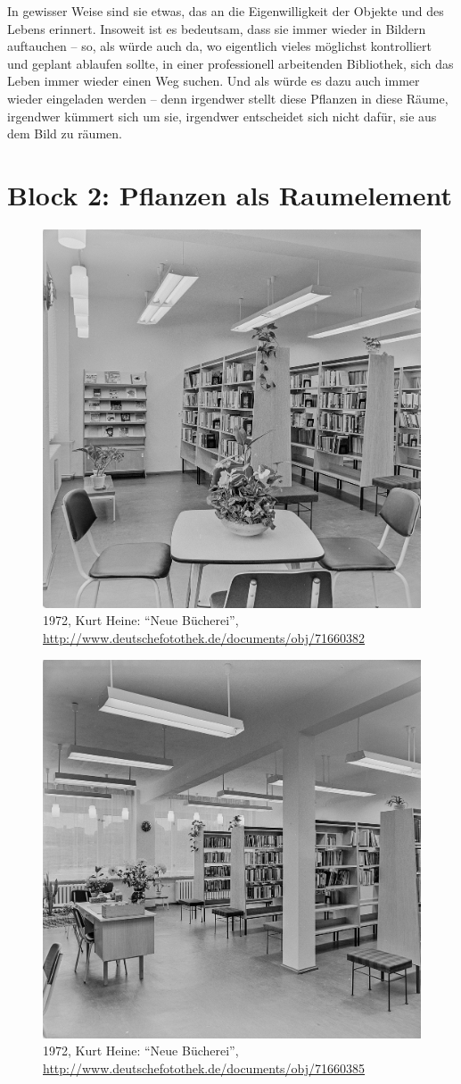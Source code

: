 \documentclass[a4paper,
fontsize=11pt,
oneside,
numbers=noperiodatend,
parskip=half-,
bibliography=totoc,
final
]{scrartcl}
\begin{document}
In gewisser Weise sind sie etwas, das an die Eigenwilligkeit der Objekte
und des Lebens erinnert. Insoweit ist es bedeutsam, dass sie immer
wieder in Bildern auftauchen -- so, als würde auch da, wo eigentlich
vieles möglichst kontrolliert und geplant ablaufen sollte, in einer
professionell arbeitenden Bibliothek, sich das Leben immer wieder einen
Weg suchen. Und als würde es dazu auch immer wieder eingeladen werden --
denn irgendwer stellt diese Pflanzen in diese Räume, irgendwer kümmert
sich um sie, irgendwer entscheidet sich nicht dafür, sie aus dem Bild zu
räumen.

\hypertarget{block-2-pflanzen-als-raumelement}{%
\section{Block 2: Pflanzen als
Raumelement}\label{block-2-pflanzen-als-raumelement}}

\begin{figure}
\centering
\includegraphics[width=0.7\columnwidth]{img/df-0008086.jpg}
\caption{1972, Kurt Heine: \enquote{Neue Bücherei},
\url{http://www.deutschefotothek.de/documents/obj/71660382}}
\end{figure}

\begin{figure}
\centering
\includegraphics[width=0.7\columnwidth]{img/df-0008089.jpg}
\caption{1972, Kurt Heine: \enquote{Neue Bücherei},
\url{http://www.deutschefotothek.de/documents/obj/71660385}}
\end{figure}
\end{document}
